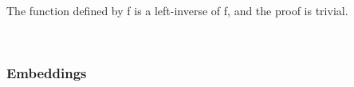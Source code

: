 \begin{code}%
\>[1]\AgdaSpace{}%
\AgdaSymbol{:}\AgdaSpace{}%
\AgdaSymbol{(}\AgdaSpace{}%
\AgdaSymbol{:}\AgdaSpace{}%
\AgdaSpace{}%
\AgdaSpace{}%
\AgdaSymbol{)}\AgdaSpace{}%
\AgdaSpace{}%
\AgdaSpace{}%
\AgdaSpace{}%
\AgdaSpace{}%
\AgdaSymbol{(}\AgdaSpace{}%
\AgdaSymbol{:}\AgdaSpace{}%
\AgdaSymbol{)}\AgdaSpace{}%
\AgdaSpace{}%
\AgdaSpace{}%
\AgdaSpace{}%
\AgdaSpace{}%
\AgdaSpace{}%
\AgdaSpace{}%
\<%
\\
%
\>[1]\AgdaSpace{}%
\AgdaSpace{}%
\AgdaSymbol{\AgdaUnderscore{}}\AgdaSpace{}%
\AgdaSymbol{=}\AgdaSpace{}%
\AgdaSpace{}%
\AgdaSpace{}%
\AgdaSpace{}%
\AgdaSpace{}%
\AgdaSpace{}%
\AgdaSpace{}%
\<%
\end{code}
\ccpad
The function defined by  \ab f  is a left-inverse of \ab f, and the proof is trivial.
\ccpad
\begin{code}%
\>[1]\AgdaSpace{}%
\AgdaSymbol{:}\AgdaSpace{}%
\AgdaSymbol{\{}\AgdaSpace{}%
\AgdaSymbol{:}\AgdaSpace{}%
\AgdaSpace{}%
\AgdaSpace{}%
\AgdaSymbol{\}\{}\AgdaSpace{}%
\AgdaSymbol{:}\AgdaSpace{}%
\AgdaSpace{}%
\AgdaSymbol{\}\{}\AgdaSpace{}%
\AgdaSymbol{:}\AgdaSpace{}%
\AgdaSymbol{\}}\AgdaSpace{}%
\AgdaSpace{}%
\AgdaSymbol{(}\AgdaSpace{}%
\AgdaSpace{}%
\AgdaSymbol{)(}\AgdaSpace{}%
\AgdaSymbol{)(}\AgdaSpace{}%
\AgdaSymbol{)}\AgdaSpace{}%
\AgdaSpace{}%
\<%
\\
%
\>[1]\AgdaSpace{}%
\AgdaSymbol{=}\AgdaSpace{}%
\<%
\end{code}


\subsubsection{Embeddings}\label{embeddings}

